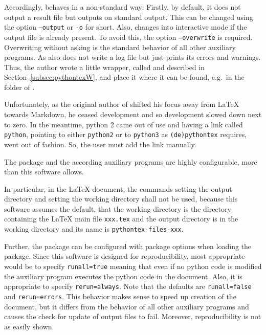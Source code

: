Accordingly,  behaves in a non-standard way: 
Firstly, by default, it does not output a result file but outputs on standard output. 
This can be changed using the option \texttt{--output} or \texttt{-o} for short. 
Also,  changes into interactive mode 
if the output file is already present. 
To avoid this, the option \texttt{--overwrite} is required. 
Overwriting without asking is the standard behavior of all other auxiliary programs. 
As  also  does not write a log file 
but just prints its errors and warnings. 
Thus, the author wrote a little wrapper, 
called  and described in Section~\ref{subsec:pythontexW}, 
and place it where it can be found, e.g.~in the folder of . 

Unfortunately, as the original author of  shifted his focus 
away from \LaTeX{} towards Markdown, 
he ceased development and so development slowed down next to zero. 
In the meantime, python 2 came out of use 
and having a link called \texttt{python}, 
pointing to either \texttt{python2} or to \texttt{python3} 
as \texttt{(de)pythontex} requires, %
went out of fashion. 
So, the user must add the link manually. 
\medskip


The package  and the according auxiliary programs are highly configurable, 
more than this software allows. 

In particular, in the \LaTeX{} document, 
the commands  setting the output directory 
and  setting the working directory shall not be used, 
because this software assumes the default, that the working directory is the directory 
containing the \LaTeX{} main file \texttt{xxx.tex}
and the output directory is in the working directory 
and its name is \texttt{pythontex-files-xxx}. 

Further, the package  can be configured with package options when loading the package. 
Since this software is designed for reproducibility, 
most appropriate would be to specify \texttt{runall=true} meaning that even if no python code is modified 
the auxiliary program  executes the python code in the document. 
Also, it is appropriate to specify \texttt{rerun=always}. 
Note that the defaults are \texttt{runall=false} and \texttt{rerun=errors}. 
This behavior makes sense to speed up creation of the document, 
but it differs from the behavior of all other auxiliary programs 
and causes the check for update of output files to fail. 
Moreover, reproducibility is not as easily shown. 

